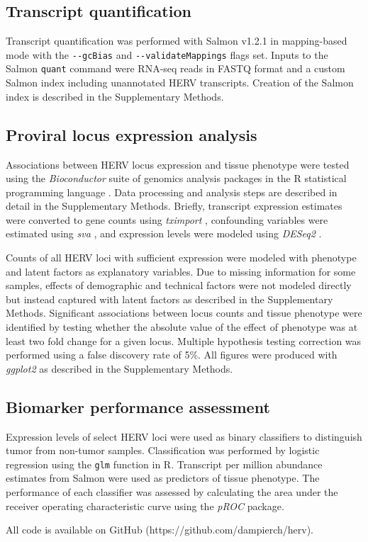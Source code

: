 \subsection*{Transcript quantification}
Transcript quantification was performed with Salmon v1.2.1 \citep{Patro2017} in mapping-based mode with the \verb|--gcBias| and \verb|--validateMappings| flags set.
Inputs to the Salmon \verb|quant| command were RNA-seq reads in FASTQ format and a custom Salmon index including unannotated HERV transcripts.
Creation of the Salmon index is described in the Supplementary Methods.

\subsection*{Proviral locus expression analysis}
Associations between HERV locus expression and tissue phenotype were tested using the \emph{Bioconductor} suite of genomics analysis packages \citep{bioc} in the R statistical programming language \citep{R}.
Data processing and analysis steps are described in detail in the Supplementary Methods.
Briefly, transcript expression estimates were converted to gene counts using \emph{tximport} \citep{Soneson2015}, confounding variables were estimated using \emph{sva} \citep{sva}, and expression levels were modeled using \emph{DESeq2} \citep{Love2014}.

Counts of all HERV loci with sufficient expression were modeled with phenotype and latent factors as explanatory variables.
Due to missing information for some samples, effects of demographic and technical factors were not modeled directly but instead captured with latent factors as described in the Supplementary Methods.
Significant associations between locus counts and tissue phenotype were identified by testing whether the absolute value of the effect of phenotype was at least two fold change for a given locus.
Multiple hypothesis testing correction was performed using a false discovery rate of 5\%.
All figures were produced with \emph{ggplot2} \citep{Wickham2016} as described in the Supplementary Methods.

\subsection*{Biomarker performance assessment}
Expression levels of select HERV loci were used as binary classifiers to distinguish tumor from non-tumor samples.
Classification was performed by logistic regression using the \verb|glm| function in R.
Transcript per million abundance estimates from Salmon were used as predictors of tissue phenotype.
The performance of each classifier was assessed by calculating the area under the receiver operating characteristic curve using the \emph{pROC} \citep{pROC} package.

All code is available on GitHub (https://github.com/dampierch/herv).
